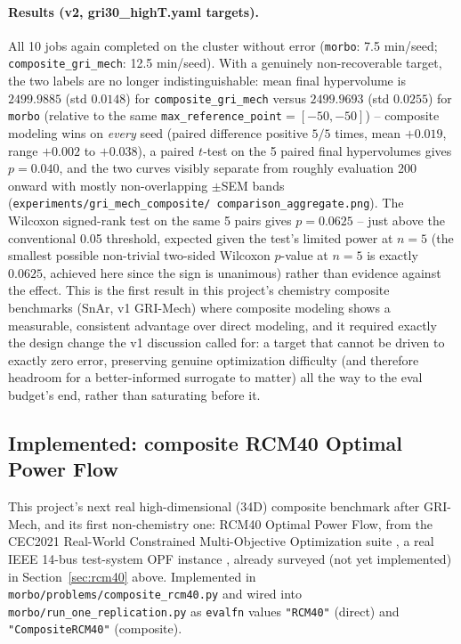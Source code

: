 \documentclass[11pt]{article}
\begin{document}
\paragraph{Results (v2, gri30\_highT.yaml targets).} All 10 jobs again
completed on the cluster without error (\texttt{morbo}: 7.5 min/seed;
\texttt{composite\_gri\_mech}: 12.5 min/seed). With a genuinely
non-recoverable target, the two labels are no longer indistinguishable:
mean final hypervolume is $2499.9885$ (std $0.0148$) for
\texttt{composite\_gri\_mech} versus $2499.9693$ (std $0.0255$) for
\texttt{morbo} (relative to the same
\texttt{max\_reference\_point}$=[-50,-50]$) -- composite modeling wins on
\emph{every} seed (paired difference positive $5/5$ times, mean
$+0.019$, range $+0.002$ to $+0.038$), a paired $t$-test on the 5 paired
final hypervolumes gives $p=0.040$, and the two curves visibly separate
from roughly evaluation 200 onward with mostly non-overlapping
$\pm$SEM bands (\texttt{experiments/gri\_mech\_composite/
comparison\_aggregate.png}). The Wilcoxon signed-rank test on the same 5
pairs gives $p=0.0625$ -- just above the conventional 0.05 threshold,
expected given the test's limited power at $n=5$ (the smallest possible
non-trivial two-sided Wilcoxon $p$-value at $n=5$ is exactly $0.0625$,
achieved here since the sign is unanimous) rather than evidence against
the effect. This is the first result in this project's chemistry
composite benchmarks (SnAr, v1 GRI-Mech) where composite modeling shows
a measurable, consistent advantage over direct modeling, and it required
exactly the design change the v1 discussion called for: a target that
cannot be driven to exactly zero error, preserving genuine optimization
difficulty (and therefore headroom for a better-informed surrogate to
matter) all the way to the eval budget's end, rather than saturating
before it.

\subsection{Implemented: composite RCM40 Optimal Power Flow}
\label{sec:rcm40-implemented}

This project's next real high-dimensional (34D) composite benchmark
after GRI-Mech, and its first non-chemistry one: RCM40 Optimal Power
Flow, from the CEC2021 Real-World Constrained Multi-Objective
Optimization suite \citep{kumar2021rwcmop}, a real IEEE 14-bus
test-system OPF instance \citep{biswas2020opf}, already surveyed (not
yet implemented) in Section~\ref{sec:rcm40} above. Implemented in
\texttt{morbo/\allowbreak problems/\allowbreak composite\_rcm40.py} and wired into
\texttt{morbo/\allowbreak run\_one\_replication.py} as \texttt{evalfn} values
\texttt{"RCM40"} (direct) and \texttt{"CompositeRCM40"} (composite).
\end{document}
